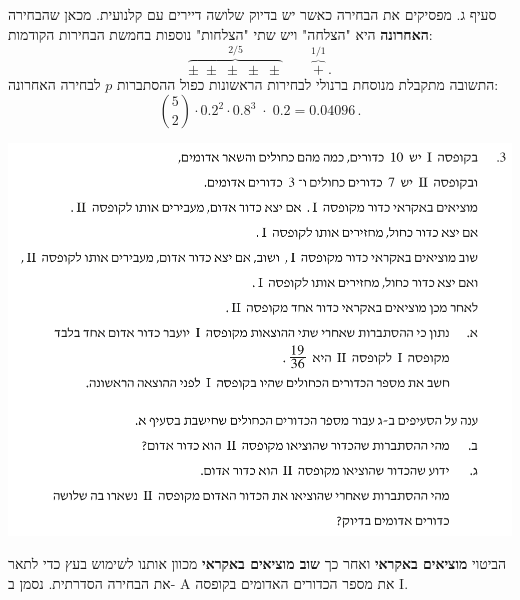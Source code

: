 \documentclass[12pt,a4paper]{article}
\begin{document}
סעיף ג. מפסיקים את הבחירה כאשר יש בדיוק שלושה דיירים עם קלנועית. מכאן שהבחירה 
\textbf{האחרונה} 
היא "הצלחה" ויש שתי "הצלחות" נוספות בחמשת הבחירות הקודמות:
\[
\overbrace{\pm\;\pm\;\pm\;\pm\;\pm}^{2/5}\quad\quad \overbrace{+}^{1/1}\,.
\]
התשובה מתקבלת מנוסחת ברנולי לבחירות הראשונות כפול ההסתברות
$p$
לבחירה האחרונה:
\[
{5\choose 2}\cdot 0.2^2 \cdot 0.8^3 \;\cdot\; 0.2=0.04096\,.
\]


\textbf{}

\begin{center}
\includegraphics[width=.95\textwidth]{summer-2017b-3}
\end{center}

הביטוי
\textbf{מוציאים באקראי}
ואחר כך
\textbf{שוב מוציאים באקראי}
מכוון אותנו לשימוש בעץ כדי לתאר את הבחירה הסדרתית. נסמן ב-%
\textsf{A}
את מספר הכדורים האדומים בקופסה 
\textsf{I}.
\end{document}
